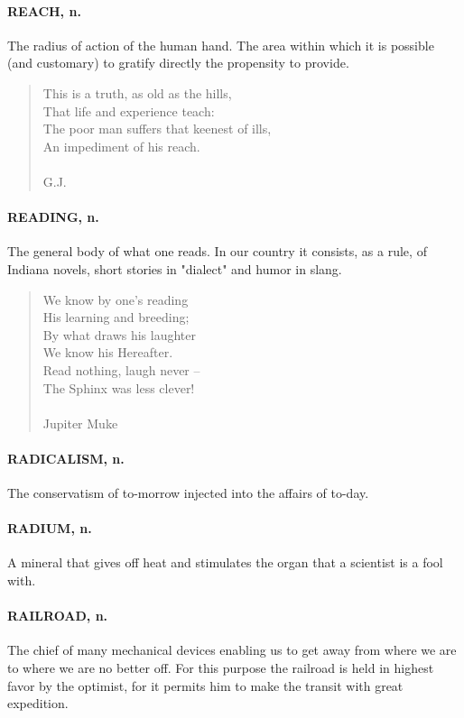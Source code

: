\documentclass[11pt]{article}
\begin{document}
\paragraph{REACH, n.}  The radius of action of the human hand.  The area within
which it is possible (and customary) to gratify directly the
propensity to provide.

\begin{quote}   This is a truth, as old as the hills, \\
      That life and experience teach: \\
  The poor man suffers that keenest of ills, \\
      An impediment of his reach. \\
 \\
G.J. \end{quote}


\paragraph{READING, n.}  The general body of what one reads.  In our country it
consists, as a rule, of Indiana novels, short stories in "dialect" and
humor in slang.

\begin{quote}   We know by one's reading \\
  His learning and breeding; \\
  By what draws his laughter \\
  We know his Hereafter. \\
  Read nothing, laugh never -- \\
  The Sphinx was less clever! \\
 \\
Jupiter Muke \end{quote}


\paragraph{RADICALISM, n.}  The conservatism of to-morrow injected into the
affairs of to-day.

\paragraph{RADIUM, n.}  A mineral that gives off heat and stimulates the organ
that a scientist is a fool with.

\paragraph{RAILROAD, n.}  The chief of many mechanical devices enabling us to get
away from where we are to where we are no better off.  For this purpose
the railroad is held in highest favor by the optimist, for it permits
him to make the transit with great expedition.
\end{document}
